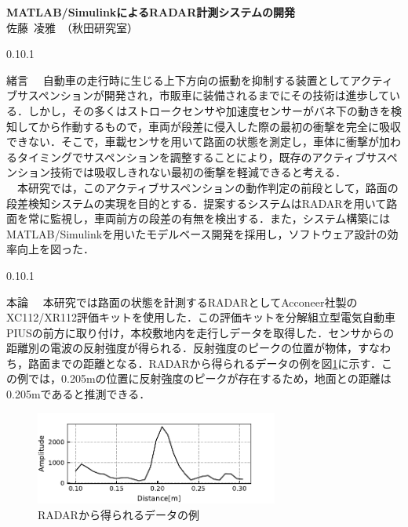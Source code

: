 \documentclass[autodetect-engine, dvipdfmx-if-dvi, ja=standard]{bxjsarticle}
\makeatletter
\renewcommand{\section}{%
    \@startsection{section}{1}{\z@}%
    {0.1\Cvs}{0.1\Cvs}%
    {\normalfont\large\headfont\raggedright}}
\makeatother
\begin{document}
\begin{center}
    \fontsize{14.053pt}{21.079pt}\selectfont
    {\bf MATLAB/SimulinkによるRADAR計測システムの開発}\\

    \fontsize{11.041pt}{16.562pt}\selectfont
    佐藤\ 凌雅\ （秋田研究室）
\end{center}


\begin{multicols}{2}
\fontsize{10.539pt}{15.809pt}\selectfont

\section{緒言}
　自動車の走行時に生じる上下方向の振動を抑制する装置としてアクティブサスペンションが開発され，市販車に装備されるまでにその技術は進歩している．しかし，その多くはストロークセンサや加速度センサーがバネ下の動きを検知してから作動するもので，車両が段差に侵入した際の最初の衝撃を完全に吸収できない．そこで，車載センサを用いて路面の状態を測定し，車体に衝撃が加わるタイミングでサスペンションを調整することにより，既存のアクティブサスペンション技術では吸収しきれない最初の衝撃を軽減できると考える．\\
　本研究では，このアクティブサスペンションの動作判定の前段として，路面の段差検知システムの実現を目的とする．提案するシステムはRADARを用いて路面を常に監視し，車両前方の段差の有無を検出する．また，システム構築にはMATLAB/Simulinkを用いたモデルベース開発を採用し，ソフトウェア設計の効率向上を図った．

\section{本論}
　本研究では路面の状態を計測するRADARとしてAcconeer社製のXC112/XR112評価キットを使用した．この評価キットを分解組立型電気自動車PIUSの前方に取り付け，本校敷地内を走行しデータを取得した．センサからの距離別の電波の反射強度が得られる．反射強度のピークの位置が物体，すなわち，路面までの距離となる．RADARから得られるデータの例を図\ref{fig:abst_demo}に示す．この例では，0.205mの位置に反射強度のピークが存在するため，地面との距離は0.205mであると推測できる．
\begin{figure}[H]
  \centering
  \includegraphics[width=8cm]{../thesis/fig/abst_demo.pdf}
  \caption{RADARから得られるデータの例}
  \label{fig:abst_demo}
\end{figure}


\end{multicols}
\end{document}
